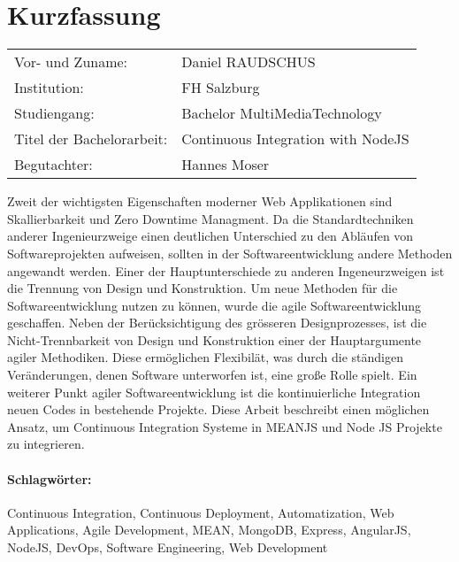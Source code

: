 \section*{Kurzfassung}
\begin{tabular}{l l}
Vor- und Zuname:& Daniel RAUDSCHUS\\
Institution: & FH Salzburg\\
Studiengang: &  Bachelor MultiMediaTechnology\\
Titel der Bachelorarbeit: & Continuous Integration with NodeJS\\
Begutachter: & Hannes Moser\\
\end{tabular}
\vspace{0.5cm}

Zweit der wichtigsten Eigenschaften moderner Web Applikationen sind Skallierbarkeit und Zero Downtime Managment. Da die Standardtechniken anderer Ingenieurzweige
einen deutlichen Unterschied zu den Abläufen von Softwareprojekten aufweisen, sollten in der Softwareentwicklung andere Methoden angewandt werden. Einer der
Hauptunterschiede zu anderen Ingeneurzweigen ist die Trennung von Design und Konstruktion. Um neue Methoden für die Softwareentwicklung nutzen zu können,
wurde die agile Softwareentwicklung geschaffen. Neben der Berücksichtigung des grösseren Designprozesses, ist die Nicht-Trennbarkeit von Design und Konstruktion
einer der Hauptargumente agiler Methodiken. Diese ermöglichen Flexibilät, was durch die ständigen Veränderungen, denen Software unterworfen ist, eine große
Rolle spielt. Ein weiterer Punkt agiler Softwareentwicklung ist die kontinuierliche Integration neuen Codes in bestehende Projekte. Diese Arbeit
beschreibt einen möglichen Ansatz, um Continuous Integration Systeme in MEANJS und Node JS Projekte zu integrieren.

\paragraph{Schlagwörter:}
Continuous Integration, Continuous Deployment, Automatization, Web Applications, Agile Development, MEAN, MongoDB, Express, AngularJS, NodeJS, DevOps, Software Engineering, Web Development
